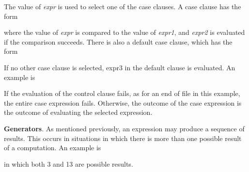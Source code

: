 The value of \textit{expr }is used to select one of the case
clauses. A case clause has the form



\noindent where the value of \textit{expr} is compared to the value of
\textit{expr1}, and \textit{expr2} is evaluated if the comparison
succeeds. There is also a default case clause, which has the form




If no other case clause is selected, expr3 in the default clause is
evaluated. An example is




If the evaluation of the control clause fails, as for an end of file in this example, the entire case expression fails.
Otherwise, the outcome of the case expression is the outcome of evaluating the selected expression.


\textbf{Generators}. As mentioned previously, an expression may
produce a sequence of results. This occurs in situations in which
there is more than one possible result of a computation. An example is



\noindent in which both 3 and 13 are possible results.

